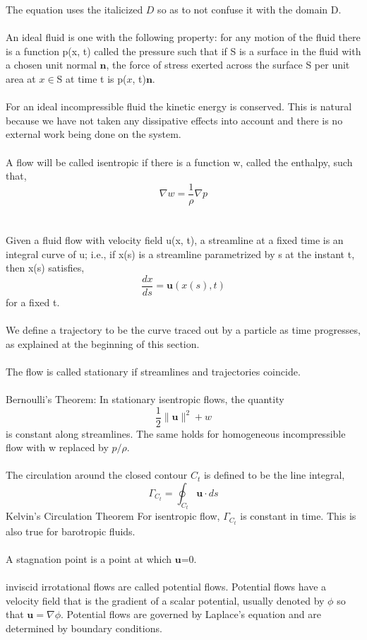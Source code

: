 \documentclass[12pt]{article}
\begin{document}
\begin{flushleft}
The equation uses the italicized $D$ so as to not confuse it with the domain D.
\\~\\
An ideal fluid is one with the following property: for any motion of the fluid there 
is a function p(x, t) called the pressure such that if S is a surface in the fluid with a chosen unit normal $\textbf{n}$, the force of stress exerted across the surface S per unit area at $x \in $S at time t is p($x$, t)$\textbf{n}$.
\\~\\
For an ideal incompressible fluid the kinetic energy is conserved. This is natural because we have not taken any dissipative effects into account and there is no external work being done on the system. 
\\~\\
A flow will be called isentropic if there is a function w, called the enthalpy, such that,
$$\nabla w = \frac{1}{\rho}\nabla p$$
\\~\\
Given a fluid flow with velocity field u(x, t), a streamline at a fixed time is an integral curve of u; i.e., if x(s) is a streamline parametrized by s at the 
instant t, then x(s) satisfies,
$$\frac{dx}{ds} = \textbf{u}(x(s),t)$$
for a fixed t.
\\~\\
We define a trajectory to be the curve traced out by a particle as time progresses, as explained at the beginning of this section.
\\~\\
The flow is called stationary if streamlines and trajectories coincide.
\\~\\
Bernoulli's Theorem: In stationary isentropic flows, the quantity 
$$\frac{1}{2}\|\textbf{u}\|^2+w$$
is constant along streamlines. The same holds for homogeneous incompressible flow with w replaced by $p/\rho$. 
\\~\\
The circulation around the closed contour $C_t$ is defined to be the line integral,
$$\Gamma_{C_t} = \oint_{C_t}\textbf{u}\cdot ds$$
Kelvin's Circulation Theorem For isentropic flow, $\Gamma_{C_t}$ is constant in time. This is also true for barotropic fluids.
\\~\\
A stagnation point is a point at which $\textbf{u}$=0.
\\~\\
inviscid irrotational flows are called potential flows. Potential flows have a velocity field that is the gradient of a scalar potential, usually denoted by $\phi$ so that $\textbf{u}=\nabla\phi$. Potential flows are governed by Laplace’s equation and are determined by boundary conditions.

\end{flushleft}
\end{document}
